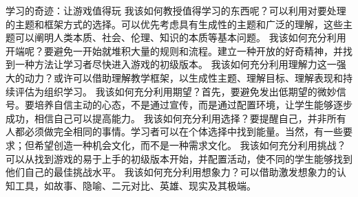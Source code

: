 学习的奇迹：让游戏值得玩
我该如何教授值得学习的东西呢？可以利用对要处理的主题和框架方式的选择。可以优先考虑具有生成性的主题和广泛的理解，这些主题可以阐明人类本质、社会、伦理、知识的本质等基本问题。
我该如何充分利用开端呢？要避免一开始就堆积大量的规则和流程。建立一种开放的好奇精神，并找到一种方法让学习者尽快进入游戏的初级版本。
我该如何充分利用理解力这一强大的动力？或许可以借助理解教学框架，以生成性主题、理解目标、理解表现和持续评估为组织学习。
我该如何充分利用期望？首先，要避免发出低期望的微妙信号。要培养自信主动的心态，不是通过宣传，而是通过配置环境，让学生能够逐步成功，相信自己可以提高能力。
我该如何充分利用选择？要提醒自己，并非所有人都必须做完全相同的事情。学习者可以在个体选择中找到能量。当然，有一些要求；但希望创造一种机会文化，而不是一种需求文化。
我该如何充分利用挑战？可以从找到游戏的易于上手的初级版本开始，并配置活动，使不同的学生能够找到他们自己的最佳挑战水平。
我该如何充分利用想象力？可以借助激发想象力的认知工具，如故事、隐喻、二元对比、英雄、现实及其极端。
